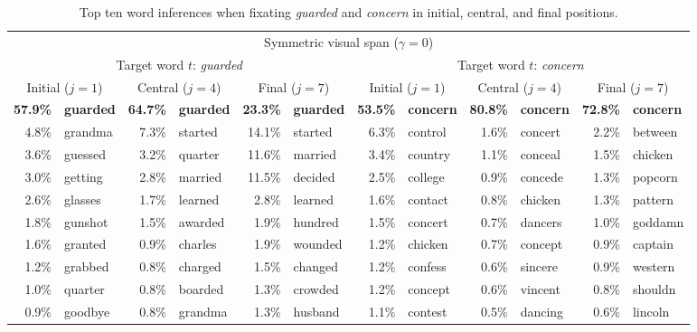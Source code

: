 \documentclass[doc,biblatex]{apa7}
\begin{document}
\begin{table}
\begin{adjustwidth}{-0.68in}{-0.68in}
\begin{center}
\begin{threeparttable}
\caption{Top ten word inferences when fixating \textit{guarded} and \textit{concern} in initial, central, and final positions.}
\footnotesize
\label{english_word_inferences}
\begin{tabular}{rlrlrlrlrlrl}
\toprule
\multicolumn{12}{c}{Symmetric visual span ($\gamma = 0$)} \\
\multicolumn{6}{c}{Target word $t$: \textit{guarded}} & \multicolumn{6}{c}{Target word $t$: \textit{concern}} \\
\multicolumn{2}{c}{Initial ($j=1$)} & \multicolumn{2}{c}{Central ($j=4$)} & \multicolumn{2}{c}{Final ($j=7$)} & \multicolumn{2}{c}{Initial ($j=1$)} & \multicolumn{2}{c}{Central ($j=4$)} & \multicolumn{2}{c}{Final ($j=7$)} \\
\textbf{57.9\%}     & \textbf{guarded} & \textbf{64.7\%}  & \textbf{guarded} & \textbf{23.3\%} & \textbf{guarded} & \textbf{53.5\%}  & \textbf{concern} & \textbf{80.8\%}  & \textbf{concern} & \textbf{72.8\%} & \textbf{concern} \\
4.8\%      & grandma & 7.3\%   & started & 14.1\% & started & 6.3\%   & control & 1.6\%   & concert & 2.2\%  & between \\
3.6\%      & guessed & 3.2\%   & quarter & 11.6\% & married & 3.4\%   & country & 1.1\%   & conceal & 1.5\%  & chicken \\
3.0\%      & getting & 2.8\%   & married & 11.5\% & decided & 2.5\%   & college & 0.9\%   & concede & 1.3\%  & popcorn \\
2.6\%      & glasses & 1.7\%   & learned & 2.8\%  & learned & 1.6\%   & contact & 0.8\%   & chicken & 1.3\%  & pattern \\
1.8\%      & gunshot & 1.5\%   & awarded & 1.9\%  & hundred & 1.5\%   & concert & 0.7\%   & dancers & 1.0\%  & goddamn \\
1.6\%      & granted & 0.9\%   & charles & 1.9\%  & wounded & 1.2\%   & chicken & 0.7\%   & concept & 0.9\%  & captain \\
1.2\%      & grabbed & 0.8\%   & charged & 1.5\%  & changed & 1.2\%   & confess & 0.6\%   & sincere & 0.9\%  & western \\
1.0\%      & quarter & 0.8\%   & boarded & 1.3\%  & crowded & 1.2\%   & concept & 0.6\%   & vincent & 0.8\%  & shouldn \\
0.9\%      & goodbye & 0.8\%   & grandma & 1.3\%  & husband & 1.1\%   & contest & 0.5\%   & dancing & 0.6\%  & lincoln \\

\end{tabular}
\end{threeparttable}
\end{center}
\end{adjustwidth}
\end{table}
\end{document}
